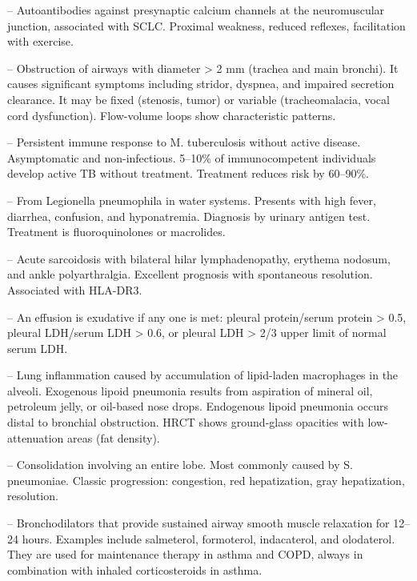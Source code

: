 -- Autoantibodies against presynaptic calcium channels at the neuromuscular junction, associated with SCLC. Proximal weakness, reduced reflexes, facilitation with exercise.

-- Obstruction of airways with diameter > 2 mm (trachea and main bronchi). It causes significant symptoms including stridor, dyspnea, and impaired secretion clearance. It may be fixed (stenosis, tumor) or variable (tracheomalacia, vocal cord dysfunction). Flow-volume loops show characteristic patterns.

-- Persistent immune response to M. tuberculosis without active disease. Asymptomatic and non-infectious. 5--10\% of immunocompetent individuals develop active TB without treatment. Treatment reduces risk by 60--90\%.

-- From Legionella pneumophila in water systems. Presents with high fever, diarrhea, confusion, and hyponatremia. Diagnosis by urinary antigen test. Treatment is fluoroquinolones or macrolides.

-- Acute sarcoidosis with bilateral hilar lymphadenopathy, erythema nodosum, and ankle polyarthralgia. Excellent prognosis with spontaneous resolution. Associated with HLA-DR3.

-- An effusion is exudative if any one is met: pleural protein/serum protein > 0.5, pleural LDH/serum LDH > 0.6, or pleural LDH > 2/3 upper limit of normal serum LDH.

-- Lung inflammation caused by accumulation of lipid-laden macrophages in the alveoli. Exogenous lipoid pneumonia results from aspiration of mineral oil, petroleum jelly, or oil-based nose drops. Endogenous lipoid pneumonia occurs distal to bronchial obstruction. HRCT shows ground-glass opacities with low-attenuation areas (fat density).

-- Consolidation involving an entire lobe. Most commonly caused by S. pneumoniae. Classic progression: congestion, red hepatization, gray hepatization, resolution.

-- Bronchodilators that provide sustained airway smooth muscle relaxation for 12--24 hours. Examples include salmeterol, formoterol, indacaterol, and olodaterol. They are used for maintenance therapy in asthma and COPD, always in combination with inhaled corticosteroids in asthma.

